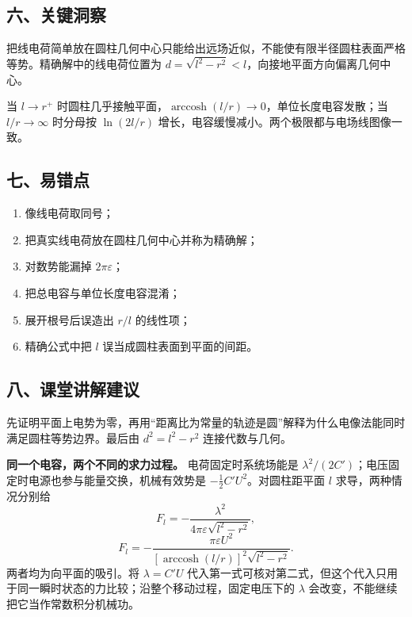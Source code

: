 \documentclass[12pt,a4paper,UTF8]{ctexart}
\newcommand{\tightlist}{\setlength{\itemsep}{0pt}\setlength{\parskip}{0pt}}
\begin{document}
\subsection{六、关键洞察}\label{ux516dux5173ux952eux6d1eux5bdf-4}

把线电荷简单放在圆柱几何中心只能给出远场近似，不能使有限半径圆柱表面严格等势。精确解中的线电荷位置为
\(d=\sqrt{l^2-r^2}<l\)，向接地平面方向偏离几何中心。

当 \(l\to r^+\)
时圆柱几乎接触平面，\(\operatorname{arccosh}(l/r)\to0\)，单位长度电容发散；当
\(l/r\to\infty\) 时分母按 \(\ln(2l/r)\)
增长，电容缓慢减小。两个极限都与电场线图像一致。

\subsection{七、易错点}\label{ux4e03ux6613ux9519ux70b9-4}

\begin{enumerate}
\def\labelenumi{\arabic{enumi}.}
\tightlist
\item
  像线电荷取同号；
\item
  把真实线电荷放在圆柱几何中心并称为精确解；
\item
  对数势能漏掉 \(2\pi\varepsilon\)；
\item
  把总电容与单位长度电容混淆；
\item
  展开根号后误造出 \(r/l\) 的线性项；
\item
  精确公式中把 \(l\) 误当成圆柱表面到平面的间距。
\end{enumerate}

\subsection{八、课堂讲解建议}\label{ux516bux8bfeux5802ux8bb2ux89e3ux5efaux8bae-4}

先证明平面上电势为零，再用``距离比为常量的轨迹是圆''解释为什么电像法能同时满足圆柱等势边界。最后由
\(d^2=l^2-r^2\) 连接代数与几何。

\textbf{同一个电容，两个不同的求力过程。} 电荷固定时系统场能是
\(\lambda^2/(2C')\)；电压固定时电源也参与能量交换，机械有效势是
\(-\tfrac12C'U^2\)。对圆柱距平面 \(l\) 求导，两种情况分别给 \[
F_l=-\frac{\lambda^2}{4\pi\varepsilon\sqrt{l^2-r^2}},
\] \[
F_l=-\frac{\pi\varepsilon U^2}
{[\operatorname{arccosh}(l/r)]^2\sqrt{l^2-r^2}}.
\] 两者均为向平面的吸引。将 \(\lambda=C'U\)
代入第一式可核对第二式，但这个代入只用于同一瞬时状态的力比较；沿整个移动过程，固定电压下的
\(\lambda\) 会改变，不能继续把它当作常数积分机械功。
\end{document}
